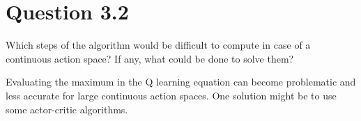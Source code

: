 \documentclass[12pt]{article}
\begin{document}
\section*{Question 3.2}

Which steps of the algorithm would be difficult to compute in case of
a continuous action space? If any, what could be done to solve them?
\newline

Evaluating the maximum in the Q learning equation can become problematic and less accurate for large continuous action spaces. One solution might be to use some actor-critic algorithms.


\pagebreak




\end{document}
